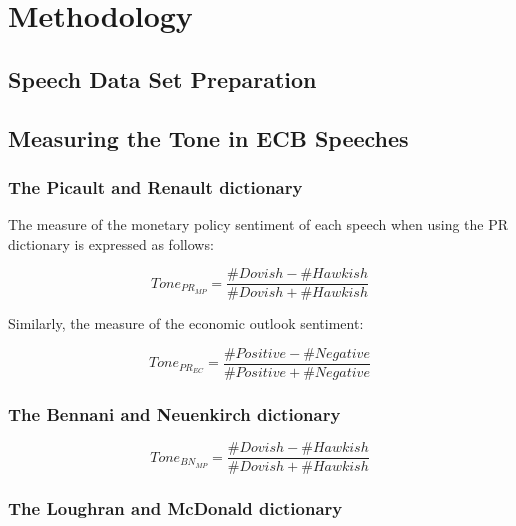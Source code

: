 \section{Methodology}
\subsection{Speech Data Set Preparation}

\subsection{Measuring the Tone in ECB Speeches}

\subsubsection{The Picault and Renault dictionary}
The measure of the monetary policy sentiment of each speech when using the PR dictionary is expressed as follows:

\begin{equation}
    Tone_{PR_{MP}}=\frac{\#Dovish-\#Hawkish}{\#Dovish+\#Hawkish}
\end{equation}

Similarly, the measure of the economic outlook sentiment:

\begin{equation}
    Tone_{PR_{EC}}=\frac{\#Positive-\#Negative}{\#Positive+\#Negative}
\end{equation}


\subsubsection{The Bennani and Neuenkirch dictionary}

\begin{equation}
    Tone_{BN_{MP}}=\frac{\#Dovish-\#Hawkish}{\#Dovish+\#Hawkish}
\end{equation}


\subsubsection{The Loughran and McDonald dictionary}

